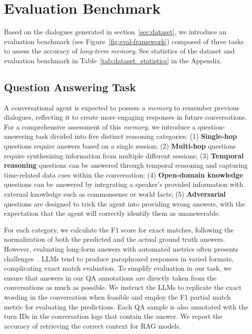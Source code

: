 \section{\dataset{} Evaluation Benchmark}
Based on the dialogues generated in section~\ref{sec:dataset}, we introduce an evaluation benchmark (see Figure~\ref{fig:eval-framework}) composed of three tasks to assess the accuracy of \textit{long-term memory}. See statistics of the dataset and evaluation benchmark in Table~\ref{tab:dataset_statistics} in the Appendix.


\subsection{Question Answering Task}
\label{ssec:benchmark-qa}
A conversational agent is expected to possess a \textit{memory} to remember previous dialogues, reflecting it to create more engaging responses in future conversations.
For a comprehensive assessment of this \textit{memory}, we introduce a question-answering task divided into five distinct reasoning categories:
(1) \textbf{Single-hop} questions require answers based on a single session;
(2) \textbf{Multi-hop} questions require synthesizing information from multiple different sessions;
(3) \textbf{Temporal reasoning} questions can be answered through temporal reasoning and capturing time-related data cues within the conversation;
(4) \textbf{Open-domain knowledge} questions can be answered by integrating a speaker's provided information with external knowledge such as commonsense or world facts;
(5) \textbf{Adversarial} questions are designed to trick the agent into providing wrong answers, with the expectation that the agent will correctly identify them as unanswerable. 

For each category, we calculate the F1 score for exact matches, following the normalization of both the predicted and the actual ground truth answers.
However, evaluating long-form answers with automated metrics often presents challenges~\cite{xu2023critical}. LLMs tend to produce paraphrased responses in varied formats, complicating exact match evaluation. To simplify evaluation in our task, we ensure that answers in our QA annotations are directly taken from the conversations as much as possible. We instruct the LLMs to replicate the exact wording in the conversation when feasible and employ the F1 partial match metric for evaluating the predictions. Each QA sample is also annotated with the turn IDs in the conversation logs that contain the answer. We report the accuracy of retrieving the correct context for RAG models.

